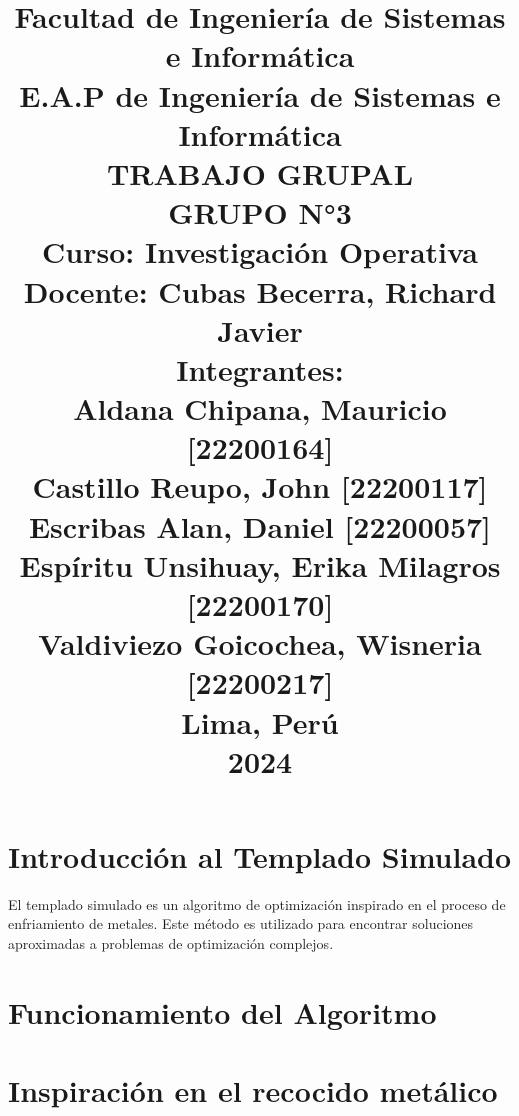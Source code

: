 \documentclass{article}
\begin{document}
\title{
Facultad de Ingeniería de Sistemas e Informática\\
E.A.P de Ingeniería de Sistemas e Informática\\
\vspace{1cm}
TRABAJO GRUPAL\\
\vspace{1cm}
GRUPO N°3\\
\vspace{1cm}
Curso: Investigación Operativa\\
Docente: Cubas Becerra, Richard Javier\\
\vspace{1cm}
Integrantes:\\
Aldana Chipana, Mauricio \hfill [22200164]\\
Castillo Reupo, John \hfill [22200117]\\
Escribas Alan, Daniel \hfill [22200057]\\
Espíritu Unsihuay, Erika Milagros \hfill [22200170]\\
Valdiviezo Goicochea, Wisneria \hfill [22200217]\\
\vspace{1cm}
Lima, Perú\\
2024
}
\date{}

\maketitle
\newpage %

\tableofcontents %
\newpage %

\section{Introducción al Templado Simulado}
El templado simulado es un algoritmo de optimización inspirado en el proceso de enfriamiento de metales. Este método es utilizado para encontrar soluciones aproximadas a problemas de optimización complejos.

\section{Funcionamiento del Algoritmo}
\section{Inspiración en el recocido metálico}
\end{document}
